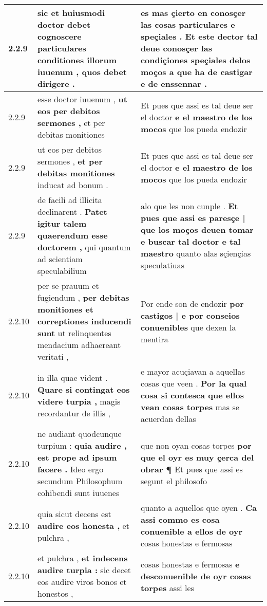 \begin{tabular}{|p{1cm}|p{6.5cm}|p{6.5cm}|}
2.2.9 & sic et huiusmodi doctor debet \textbf{ cognoscere particulares conditiones illorum iuuenum , } quos debet dirigere . & es mas çierto en conosçer las cosas particulares e speçiales . \textbf{ Et este dector tal deue conosçer las condiçiones speçiales delos moços } a que ha de castigar e de enssennar . \\\hline
2.2.9 & esse doctor iuuenum , \textbf{ ut eos per debitos sermones , } et per debitas monitiones & Et pues que assi es tal deue ser el doctor \textbf{ e el maestro de los mocos } que los pueda endozir \\\hline
2.2.9 & ut eos per debitos sermones , \textbf{ et per debitas monitiones } inducat ad bonum . & Et pues que assi es tal deue ser el doctor \textbf{ e el maestro de los mocos } que los pueda endozir \\\hline
2.2.9 & de facili ad illicita declinarent . \textbf{ Patet igitur talem quaerendum esse doctorem , } qui quantum ad scientiam speculabilium & alo que les non cunple . \textbf{ Et pues que assi es paresçe | que los moços deuen tomar e buscar tal doctor e tal maestro } quanto alas sçiençias speculatiuas \\\hline
2.2.10 & per se prauum et fugiendum , \textbf{ per debitas monitiones et correptiones inducendi sunt } ut relinquentes mendacium adhaereant veritati , & Por ende son de endozir \textbf{ por castigos | e por conseios conuenibles } que dexen la mentira \\\hline
2.2.10 & in illa quae vident . \textbf{ Quare si contingat eos videre turpia , } magis recordantur de illis , & e mayor acuçiavan a aquellas cosas que veen . \textbf{ Por la qual cosa si contesca que ellos vean cosas torpes } mas se acuerdan dellas \\\hline
2.2.10 & ne audiant quodcunque turpium : \textbf{ quia audire , est prope ad ipsum facere . } Ideo ergo secundum Philosophum cohibendi sunt iuuenes & que non oyan cosas torpes \textbf{ por que el oyr es muy çerca del obrar ¶ } Et pues que assi es segunt el philosofo \\\hline
2.2.10 & quia sicut decens est \textbf{ audire eos honesta , } et pulchra , & quanto a aquellos que oyen . \textbf{ Ca assi commo es cosa conuenible a ellos de oyr } cosas honestas e fermosas \\\hline
2.2.10 & et pulchra , \textbf{ et indecens audire turpia : } sic decet eos audire viros bonos et honestos , & cosas honestas e fermosas \textbf{ e desconuenible de oyr cosas torpes } assi les \\\hline

\end{tabular}
